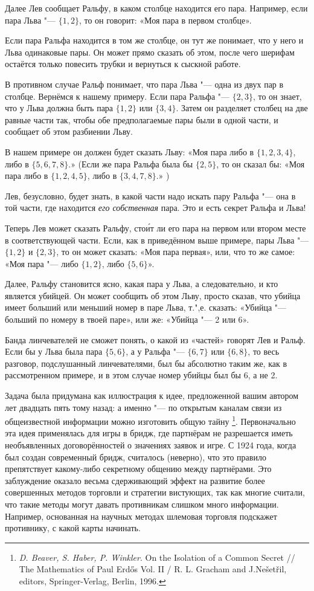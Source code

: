 \documentclass[twoside]{book}
\begin{document}
Далее Лев сообщает Ральфу, в каком столбце находится его пара.
Например, если пара Льва "--- $\{1,2\}$, то он говорит: «Моя пара в первом столбце». 

Если пара Ральфа находится в том же столбце, он тут же понимает, что у него и Льва одинаковые пары.
Он может прямо сказать об этом, после чего шерифам остаётся только повесить трубки и вернуться к сыскной работе.

В противном случае Ральф понимает, что пара Льва "--- одна из двух пар в столбце.
Вернёмся к нашему примеру.
Если пара Ральфа "--- $\{2,3\}$, то он знает, что у Льва должна быть пара $\{1,2\}$ или $\{3,4\}$.
Затем он разделяет столбец на две равные части так, чтобы обе предполагаемые пары были в одной части, и сообщает об этом разбиении Льву.

В нашем примере он должен будет сказать Льву: «Моя пара либо в $\{1,2,3,4\}$, либо в $\{5,6,7,8\}$.» (Если же пара Ральфа была бы $\{2,5\}$, то он сказал бы: «Моя пара либо в $\{1,2,4,5\}$, либо в $\{3,4,7,8\}$.» )

Лев, безусловно, будет знать, в какой части надо искать пару Ральфа "--- она в той части, где находится \emph{его собственная} пара.
Это и есть секрет Ральфа и Льва!

Теперь Лев может сказать Ральфу, сто\'{и}т ли его пара на первом или втором месте в соответствующей части.
Если, как в приведённом выше примере, пары Льва "--- $\{1,2\}$ и $\{2,3\}$, то он может сказать: «Моя пара первая», или, что то же самое: «Моя пара "--- либо $\{1,2\}$, либо $\{5,6\}$».

Далее, Ральфу становится ясно, какая пара у Льва, а следовательно, и кто является убийцей.
Он может сообщить об этом Льву, просто сказав, что убийца  имеет больший или меньший номер в паре Льва, т.",е. сказать: «Убийца "--- больший по номеру в твоей паре», или же: «Убийца "--- 2 или 6».

Банда линчевателей не сможет понять, о какой из «частей» говорят Лев и Ральф.
Если бы у Льва была пара $\{5,6\}$, а у Ральфа "--- $\{6,7\}$ или $\{6,8\}$, то весь разговор, подслушанный линчевателями, был бы абсолютно таким же, как в рассмотренном примере, и в этом случае номер убийцы был бы 6, а не 2.
\heart
 
Задача была придумана как иллюстрация к идее, предложенной вашим автором лет двадцать пять тому назад:
а именно "--- по открытым каналам связи из общеизвестной информации можно изготовить общую тайну%
\footnote{\emph{D. Beaver, S. Haber, P. Winkler}. On the Isolation of a Common Secret /\!/ {The Mathematics of Paul Erd\H{o}s} Vol. II / R. L. Gracham and J.Ne\v{s}et\v{r}il, editors, Springer-Verlag, Berlin, 1996.}.
Первоначально эта идея применялась для игры в бридж, где партнёрам не разрешается иметь необъявленных договорённостей о значениях заявок и игре.
С 1924 года, когда был создан современный бридж, считалось (неверно), что это правило препятствует какому-либо секретному общению между партнёрами.
Это заблуждение оказало весьма сдерживающий эффект на развитие более совершенных методов торговли и стратегии вистующих, так как многие считали, что такие методы могут давать противникам слишком много информации.
Например, основанная на научных методах шлемовая торговля подскажет противнику, с какой карты начинать.
\end{document}
